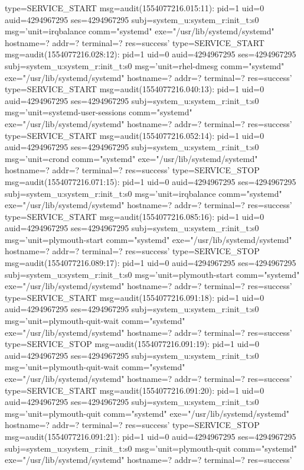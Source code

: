 \documentclass[]{report}
\newenvironment{Shaded}{}{}
\newcommand{\NormalTok}[1]{#1}
\begin{document}
\begin{Shaded}
\begin{Highlighting}[]
\NormalTok{type=SERVICE_START msg=audit(1554077216.015:11): pid=1 uid=0 auid=4294967295 ses=4294967295 subj=system_u:system_r:init_t:s0 msg='unit=irqbalance comm="systemd" exe="/usr/lib/systemd/systemd" hostname=? addr=? terminal=? res=success'}
\NormalTok{type=SERVICE_START msg=audit(1554077216.028:12): pid=1 uid=0 auid=4294967295 ses=4294967295 subj=system_u:system_r:init_t:s0 msg='unit=rhel-dmesg comm="systemd" exe="/usr/lib/systemd/systemd" hostname=? addr=? terminal=? res=success'}
\NormalTok{type=SERVICE_START msg=audit(1554077216.040:13): pid=1 uid=0 auid=4294967295 ses=4294967295 subj=system_u:system_r:init_t:s0 msg='unit=systemd-user-sessions comm="systemd" exe="/usr/lib/systemd/systemd" hostname=? addr=? terminal=? res=success'}
\NormalTok{type=SERVICE_START msg=audit(1554077216.052:14): pid=1 uid=0 auid=4294967295 ses=4294967295 subj=system_u:system_r:init_t:s0 msg='unit=crond comm="systemd" exe="/usr/lib/systemd/systemd" hostname=? addr=? terminal=? res=success'}
\NormalTok{type=SERVICE_STOP msg=audit(1554077216.071:15): pid=1 uid=0 auid=4294967295 ses=4294967295 subj=system_u:system_r:init_t:s0 msg='unit=irqbalance comm="systemd" exe="/usr/lib/systemd/systemd" hostname=? addr=? terminal=? res=success'}
\NormalTok{type=SERVICE_START msg=audit(1554077216.085:16): pid=1 uid=0 auid=4294967295 ses=4294967295 subj=system_u:system_r:init_t:s0 msg='unit=plymouth-start comm="systemd" exe="/usr/lib/systemd/systemd" hostname=? addr=? terminal=? res=success'}
\NormalTok{type=SERVICE_STOP msg=audit(1554077216.089:17): pid=1 uid=0 auid=4294967295 ses=4294967295 subj=system_u:system_r:init_t:s0 msg='unit=plymouth-start comm="systemd" exe="/usr/lib/systemd/systemd" hostname=? addr=? terminal=? res=success'}
\NormalTok{type=SERVICE_START msg=audit(1554077216.091:18): pid=1 uid=0 auid=4294967295 ses=4294967295 subj=system_u:system_r:init_t:s0 msg='unit=plymouth-quit-wait comm="systemd" exe="/usr/lib/systemd/systemd" hostname=? addr=? terminal=? res=success'}
\NormalTok{type=SERVICE_STOP msg=audit(1554077216.091:19): pid=1 uid=0 auid=4294967295 ses=4294967295 subj=system_u:system_r:init_t:s0 msg='unit=plymouth-quit-wait comm="systemd" exe="/usr/lib/systemd/systemd" hostname=? addr=? terminal=? res=success'}
\NormalTok{type=SERVICE_START msg=audit(1554077216.091:20): pid=1 uid=0 auid=4294967295 ses=4294967295 subj=system_u:system_r:init_t:s0 msg='unit=plymouth-quit comm="systemd" exe="/usr/lib/systemd/systemd" hostname=? addr=? terminal=? res=success'}
\NormalTok{type=SERVICE_STOP msg=audit(1554077216.091:21): pid=1 uid=0 auid=4294967295 ses=4294967295 subj=system_u:system_r:init_t:s0 msg='unit=plymouth-quit comm="systemd" exe="/usr/lib/systemd/systemd" hostname=? addr=? terminal=? res=success'}

\end{Highlighting}
\end{Shaded}
\end{document}
